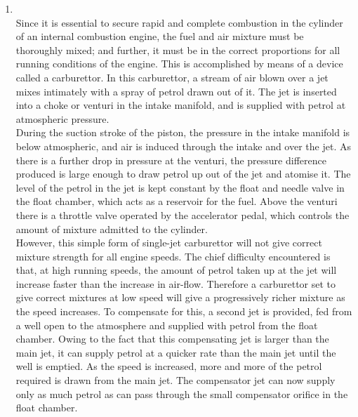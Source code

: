 \documentclass[12pt]{article}
\begin{document}
\begin{enumerate}
      But the decline of authority in the twentieth century has not necessarily meant a rise in liberty. For the concept of authority is not something which stands logically opposed to that of freedom, although some unreflective people may think it does. Authority is really a special kind of power which rests on the consent and belief of those who live under it. Without such free assent, there can be no such thing as authority. So freedom in this important sense is part of the very notions of authority. And when authority is removed, is only too likely that it will be followed either by the rule of naked power or by anarchy.

    \item {}\\
      Since it is essential to secure rapid and complete combustion in the cylinder of an internal combustion engine, the fuel and air mixture must be thoroughly mixed; and further, it must be in the correct proportions for all running conditions of the engine. This is accomplished by means of a device called a carburettor. In this carburettor, a stream of air blown over a jet mixes intimately with a spray of petrol drawn out of it. The jet is inserted into a choke or venturi in the intake manifold, and is supplied with petrol at atmospheric pressure.\\

      During the suction stroke of the piston, the pressure in the intake manifold is below atmospheric, and air is induced through the intake and over the jet. As there is a further drop in pressure at the venturi, the pressure difference produced is large enough to draw petrol up out of the jet and atomise it. The level of the petrol in the jet is kept constant by the float and needle valve in the float chamber, which acts as a reservoir for the fuel. Above the venturi there is a throttle valve operated by the accelerator pedal, which controls the amount of mixture admitted to the cylinder.\\

      However, this simple form of single-jet carburettor will not give correct mixture strength for all engine speeds. The chief difficulty encountered is that, at high running speeds, the amount of petrol taken up at the jet will increase faster than the increase in air-flow. Therefore a carburettor set to give correct mixtures at low speed will give a progressively richer mixture as the speed increases. To compensate for this, a second jet is provided, fed from a well open to the atmosphere and supplied with petrol from the float chamber. Owing to the fact that this compensating jet is larger than the main jet, it can supply petrol at a quicker rate than the main jet until the well is emptied. As the speed is increased, more and more of the petrol required is drawn from the main jet. The compensator jet can now supply only as much petrol as can pass through the small compensator orifice in the float chamber.\\


\end{enumerate}
\end{document}
